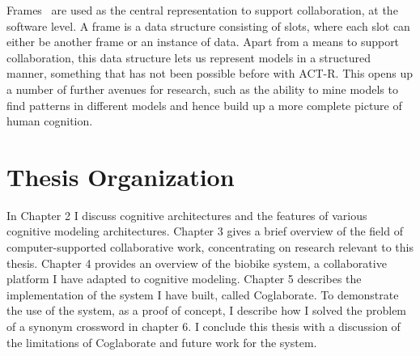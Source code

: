 Frames~\cite{Minsky1974a} are used as the central representation to
support collaboration, at the software level.  A frame is a data
structure consisting of slots, where each slot can either be another
frame or an instance of data. Apart from a means to support
collaboration, this data structure lets us represent models in a
structured manner, something that has not been possible before with
ACT-R.  This opens up a number of further avenues for research, such
as the ability to mine models to find patterns in different models and
hence build up a more complete picture of human cognition.



\section{Thesis Organization}
In Chapter 2 I discuss cognitive architectures and the features of
various cognitive modeling architectures. Chapter 3 gives a brief
overview of the field of computer-supported collaborative work,
concentrating on research relevant to this thesis.  Chapter 4 provides
an overview of the biobike system, a collaborative platform I have
adapted to cognitive modeling.  Chapter 5 describes the implementation
of the system I have built, called Coglaborate.  To demonstrate the
use of the system, as a proof of concept, I describe how I solved the
problem of a synonym crossword in chapter 6.  I conclude this thesis
with a discussion of the limitations of Coglaborate and future work
for the system.

